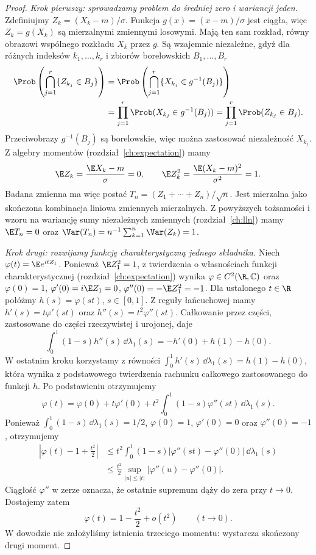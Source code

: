 \begin{proof}
\emph{Krok pierwszy: sprowadzamy problem do średniej
zero i wariancji jeden.}
Zdefiniujmy $Z_k=(X_k-m)/\sigma$.
Funkcja $g(x)=(x-m)/\sigma$ jest ciągła, więc
$Z_k=g(X_k)$ są mierzalnymi zmiennymi losowymi.
Mają ten sam rozkład, równy obrazowi wspólnego
rozkładu $X_k$ przez $g$. Są wzajemnie niezależne,
gdyż dla różnych indeksów $k_1,\ldots,k_r$
i zbiorów borelowskich $B_1,\ldots,B_r$
\[
\begin{aligned}
\Prob\left(\bigcap_{j=1}^r\{Z_{k_j}\in B_j\}\right)
&=\Prob\left(\bigcap_{j=1}^r\{X_{k_j}\in g^{-1}(B_j)\}\right)\\
&=\prod_{j=1}^r\Prob(X_{k_j}\in g^{-1}(B_j))
=\prod_{j=1}^r\Prob(Z_{k_j}\in B_j).
\end{aligned}
\]
Przeciwobrazy $g^{-1}(B_j)$ są borelowskie,
więc można zastosować niezależność $X_{k_j}$.
Z algebry momentów (rozdział~\ref{ch:expectation}) mamy
\[
\E Z_k=\frac{\E X_k-m}{\sigma}=0,\qquad
\E Z_k^2=\frac{\E(X_k-m)^2}{\sigma^2}=1.
\]
Badana zmienna ma więc postać
$T_n=(Z_1+\cdots+Z_n)/\sqrt n$.
Jest mierzalna jako skończona kombinacja liniowa
zmiennych mierzalnych. Z powyższych tożsamości
i wzoru na wariancję sumy niezależnych zmiennych
(rozdział~\ref{ch:lln}) mamy
$\E T_n=0$ oraz $\Var(T_n)=n^{-1}\sum_{k=1}^n\Var(Z_k)=1$.

\emph{Krok drugi: rozwijamy funkcję charakterystyczną
jednego składnika.} Niech $\varphi(t)=\E e^{itZ_1}$.
Ponieważ $\E Z_1^2=1$, z twierdzenia o własnościach
funkcji charakterystycznej (rozdział~\ref{ch:expectation})
wynika $\varphi\in C^2(\R,\mathbb C)$ oraz
$\varphi(0)=1$, $\varphi'(0)=i\E Z_1=0$,
$\varphi''(0)=-\E Z_1^2=-1$.
Dla ustalonego $t\in\R$ połóżmy $h(s)=\varphi(st)$,
$s\in[0,1]$. Z reguły łańcuchowej mamy
$h'(s)=t\varphi'(st)$ oraz $h''(s)=t^2\varphi''(st)$.
Całkowanie przez części, zastosowane do części
rzeczywistej i urojonej, daje
\[
\int_0^1(1-s)h''(s)\,\dd\lambda_1(s)
=-h'(0)+h(1)-h(0).
\]
W ostatnim kroku korzystamy z równości
$\int_0^1h'(s)\,\dd\lambda_1(s)=h(1)-h(0)$,
która wynika z podstawowego twierdzenia rachunku
całkowego zastosowanego do funkcji $h$.
Po podstawieniu
otrzymujemy
\[
\varphi(t)=\varphi(0)+t\varphi'(0)
+t^2\int_0^1(1-s)\varphi''(st)\,\dd\lambda_1(s).
\]
Ponieważ $\int_0^1(1-s)\,\dd\lambda_1(s)=1/2$,
$\varphi(0)=1$, $\varphi'(0)=0$ oraz $\varphi''(0)=-1$,
otrzymujemy
\[
\begin{aligned}
\left|\varphi(t)-1+\frac{t^2}{2}\right|
&\leq t^2\int_0^1(1-s)|\varphi''(st)-\varphi''(0)|
\,\dd\lambda_1(s)\\
&\leq\frac{t^2}{2}
\sup_{|u|\leq |t|}|\varphi''(u)-\varphi''(0)|.
\end{aligned}
\]
Ciągłość $\varphi''$ w zerze oznacza, że ostatnie
supremum dąży do zera przy $t\to0$. Dostajemy zatem
\[
\varphi(t)=1-\frac{t^2}{2}+o(t^2)\qquad(t\to0).
\]
W dowodzie nie założyliśmy istnienia trzeciego
momentu: wystarcza skończony drugi moment.


\end{proof}
